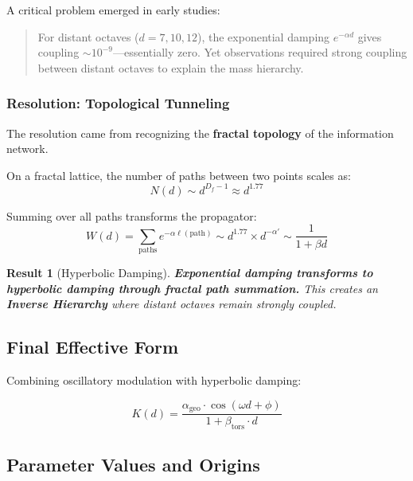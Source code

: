 \documentclass[11pt, a4paper]{article}
\newtheorem{result}{Result}[section]
\theoremstyle{remark}
\newcommand{\Kd}{K(d)}
\newcommand{\alphageo}{\alpha_{\text{geo}}}
\newcommand{\betators}{\beta_{\text{tors}}}
\begin{document}
A critical problem emerged in early studies:

\begin{quote}
For distant octaves ($d = 7, 10, 12$), the exponential damping $e^{-\alpha d}$ gives coupling $\sim 10^{-9}$—essentially zero. Yet observations required strong coupling between distant octaves to explain the mass hierarchy.
\end{quote}

\subsubsection{Resolution: Topological Tunneling}

The resolution came from recognizing the \textbf{fractal topology} of the information network.

On a fractal lattice, the number of paths between two points scales as:
\begin{equation}
N(d) \sim d^{D_f - 1} \approx d^{1.77}
\end{equation}

Summing over all paths transforms the propagator:
\begin{equation}
W(d) = \sum_{\text{paths}} e^{-\alpha \ell(\text{path})} \sim d^{1.77} \times d^{-\alpha'} \sim \frac{1}{1 + \beta d}
\end{equation}

\begin{result}[Hyperbolic Damping]
\textbf{Exponential damping transforms to hyperbolic damping through fractal path summation.} This creates an \textbf{Inverse Hierarchy} where distant octaves remain strongly coupled.
\end{result}

\subsection{Final Effective Form}

Combining oscillatory modulation with hyperbolic damping:

\begin{equation}
\boxed{
\Kd = \frac{\alphageo \cdot \cos(\omega d + \phi)}{1 + \betators \cdot d}
}
\label{eq:kernel}
\end{equation}

\subsection{Parameter Values and Origins}
\end{document}
